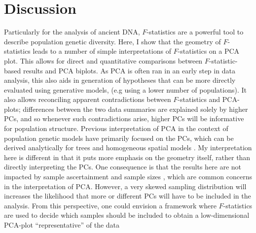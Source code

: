 \documentclass[12pt,fullpage, a4paper]{article}
\begin{document}
\section{Discussion}
Particularly for the analysis of ancient DNA, $F$-statistics  are  a powerful tool to describe population genetic diversity. Here, I show that the geometry of $F$-statistics \citep{oteo-garcia2021} leads to a number of simple interpretations of $F$-statistics on a PCA plot. This allows for direct and quantitative comparisons between $F$-statistic-based results and PCA biplots. As PCA is often ran in an early step in data analysis, this also aids in generation of hypotheses that can be more directly evaluated using generative models, (e.g using a lower number of populations). It also allows reconciling apparent contradictions between $F$-statistics and PCA-plots; differences between the two data summaries are explained solely by higher PCs, and so whenever such contradictions arise, higher PCs will be informative for population structure. Previous interpretation of PCA in the context of population genetic models have primarily focused on the PCs, which can be derived analytically for trees \citep{cavalli-sforza1975} and homogeneous spatial models \citep{novembre2008a}. My interpretation here is different in that it puts more emphasis on the geometry itself, rather than directly interpreting the PCs. One consequence is that the results here are not impacted by sample ascertainment and sample sizes \citep{mcvean2009, novembre2008a}, which are common concerns in the interpretation of PCA. However, a very skewed sampling distribution will increases the likelihood that more or different PCs will have to be included in the analysis. From this perspective, one could envision a framework where $F$-statistics are used to decide which samples should be included to obtain a low-dimensional PCA-plot ``representative'' of the data
\end{document}
